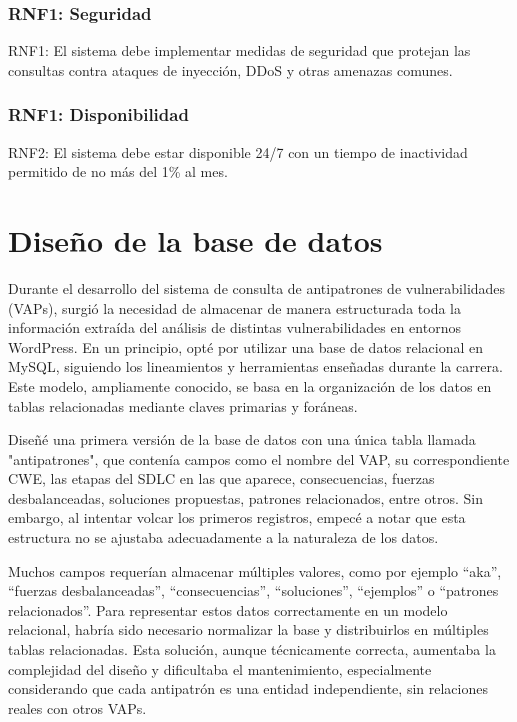 \subsubsection{RNF1: Seguridad}

RNF1: El sistema debe implementar medidas de seguridad que protejan las consultas contra ataques de inyección, DDoS y otras amenazas comunes.

\subsubsection{RNF1: Disponibilidad}

RNF2: El sistema debe estar disponible 24/7 con un tiempo de inactividad permitido de no más del 1\% al mes.


\section{Diseño de la base de datos}

Durante el desarrollo del sistema de consulta de antipatrones de vulnerabilidades (VAPs), surgió la necesidad de almacenar de manera estructurada toda la información extraída del análisis de distintas vulnerabilidades en entornos WordPress. En un principio, opté por utilizar una base de datos relacional en MySQL, siguiendo los lineamientos y herramientas enseñadas durante la carrera. Este modelo, ampliamente conocido, se basa en la organización de los datos en tablas relacionadas mediante claves primarias y foráneas.

Diseñé una primera versión de la base de datos con una única tabla llamada "antipatrones", que contenía campos como el nombre del VAP, su correspondiente CWE, las etapas del SDLC en las que aparece, consecuencias, fuerzas desbalanceadas, soluciones propuestas, patrones relacionados, entre otros. Sin embargo, al intentar volcar los primeros registros, empecé a notar que esta estructura no se ajustaba adecuadamente a la naturaleza de los datos.

Muchos campos requerían almacenar múltiples valores, como por ejemplo “aka”, “fuerzas desbalanceadas”, “consecuencias”, “soluciones”, “ejemplos” o “patrones relacionados”. Para representar estos datos correctamente en un modelo relacional, habría sido necesario normalizar la base y distribuirlos en múltiples tablas relacionadas. Esta solución, aunque técnicamente correcta, aumentaba la complejidad del diseño y dificultaba el mantenimiento, especialmente considerando que cada antipatrón es una entidad independiente, sin relaciones reales con otros VAPs.

